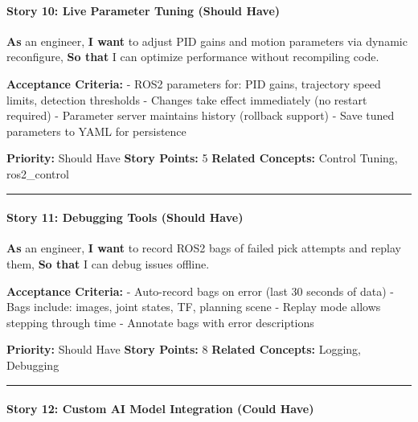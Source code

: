\documentclass[
]{article}
\begin{document}
\hypertarget{story-10-live-parameter-tuning-should-have}{%
\paragraph{Story 10: Live Parameter Tuning (Should
Have)}\label{story-10-live-parameter-tuning-should-have}}

\textbf{As} an engineer, \textbf{I want} to adjust PID gains and motion
parameters via dynamic reconfigure, \textbf{So that} I can optimize
performance without recompiling code.

\textbf{Acceptance Criteria:} - ROS2 parameters for: PID gains,
trajectory speed limits, detection thresholds - Changes take effect
immediately (no restart required) - Parameter server maintains history
(rollback support) - Save tuned parameters to YAML for persistence

\textbf{Priority:} Should Have \textbf{Story Points:} 5 \textbf{Related
Concepts:} Control Tuning, ros2\_control

\begin{center}\rule{0.5\linewidth}{0.5pt}\end{center}

\hypertarget{story-11-debugging-tools-should-have}{%
\paragraph{Story 11: Debugging Tools (Should
Have)}\label{story-11-debugging-tools-should-have}}

\textbf{As} an engineer, \textbf{I want} to record ROS2 bags of failed
pick attempts and replay them, \textbf{So that} I can debug issues
offline.

\textbf{Acceptance Criteria:} - Auto-record bags on error (last 30
seconds of data) - Bags include: images, joint states, TF, planning
scene - Replay mode allows stepping through time - Annotate bags with
error descriptions

\textbf{Priority:} Should Have \textbf{Story Points:} 8 \textbf{Related
Concepts:} Logging, Debugging

\begin{center}\rule{0.5\linewidth}{0.5pt}\end{center}

\hypertarget{story-12-custom-ai-model-integration-could-have}{%
\paragraph{Story 12: Custom AI Model Integration (Could
Have)}\label{story-12-custom-ai-model-integration-could-have}}
\end{document}
